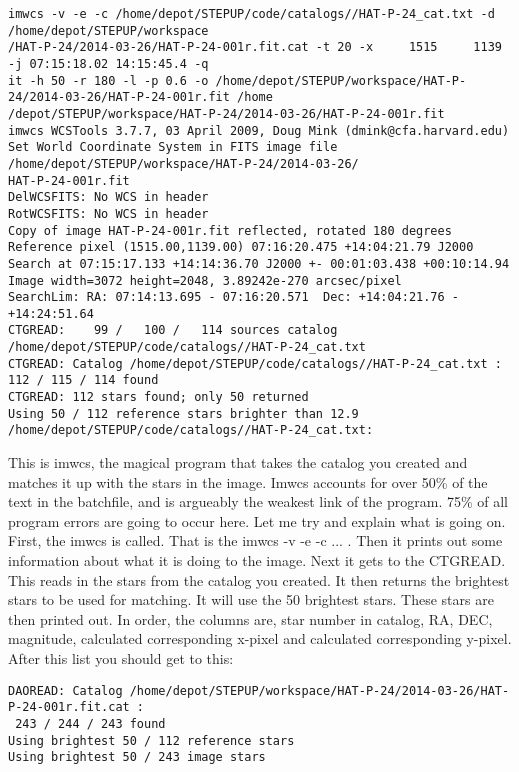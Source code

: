 \documentclass[10pt,preprint]{aastex}
\begin{document}
\begin{verbatim}
imwcs -v -e -c /home/depot/STEPUP/code/catalogs//HAT-P-24_cat.txt -d /home/depot/STEPUP/workspace
/HAT-P-24/2014-03-26/HAT-P-24-001r.fit.cat -t 20 -x     1515     1139 -j 07:15:18.02 14:15:45.4 -q 
it -h 50 -r 180 -l -p 0.6 -o /home/depot/STEPUP/workspace/HAT-P-24/2014-03-26/HAT-P-24-001r.fit /home
/depot/STEPUP/workspace/HAT-P-24/2014-03-26/HAT-P-24-001r.fit
imwcs WCSTools 3.7.7, 03 April 2009, Doug Mink (dmink@cfa.harvard.edu)
Set World Coordinate System in FITS image file /home/depot/STEPUP/workspace/HAT-P-24/2014-03-26/
HAT-P-24-001r.fit
DelWCSFITS: No WCS in header
RotWCSFITS: No WCS in header
Copy of image HAT-P-24-001r.fit reflected, rotated 180 degrees
Reference pixel (1515.00,1139.00) 07:16:20.475 +14:04:21.79 J2000
Search at 07:15:17.133 +14:14:36.70 J2000 +- 00:01:03.438 +00:10:14.94
Image width=3072 height=2048, 3.89242e-270 arcsec/pixel
SearchLim: RA: 07:14:13.695 - 07:16:20.571  Dec: +14:04:21.76 - +14:24:51.64
CTGREAD:    99 /   100 /   114 sources catalog /home/depot/STEPUP/code/catalogs//HAT-P-24_cat.txt
CTGREAD: Catalog /home/depot/STEPUP/code/catalogs//HAT-P-24_cat.txt : 112 / 115 / 114 found
CTGREAD: 112 stars found; only 50 returned
Using 50 / 112 reference stars brighter than 12.9
/home/depot/STEPUP/code/catalogs//HAT-P-24_cat.txt:
\end{verbatim}

This is imwcs, the magical program that takes the catalog you created and matches it up with the stars in the image. Imwcs accounts for over 50\% of the text in the batchfile, and is argueably the weakest link of the program. 75\% of all program errors are going to occur here. Let me try and explain what is going on.  First, the imwcs is called. That is the imwcs -v -e -c ... . Then it prints out some information about what it is doing to the image.  Next it gets to the CTGREAD. This reads in the stars from the catalog you created. It then returns the brightest stars to be used for matching. It will use the 50 brightest stars. These stars are then printed out. In order, the columns are, star number in catalog, RA, DEC, magnitude, calculated corresponding x-pixel and calculated corresponding y-pixel. After this list you should get to this:

\begin{verbatim}
DAOREAD: Catalog /home/depot/STEPUP/workspace/HAT-P-24/2014-03-26/HAT-P-24-001r.fit.cat :
 243 / 244 / 243 found
Using brightest 50 / 112 reference stars
Using brightest 50 / 243 image stars
\end{verbatim}
\end{document}
